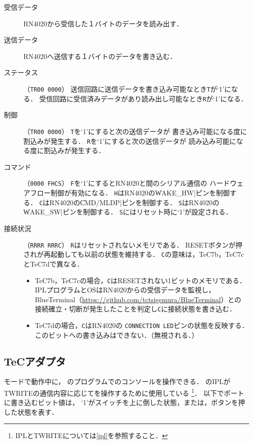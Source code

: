 \begin{description}
\item[受信データ]
  RN4020から受信した１バイトのデータを読み出す．
\item[送信データ]
  RN4020へ送信する１バイトのデータを書き込む．
\item[ステータス]（\texttt{TR00 0000}）
  送信回路に送信データを書き込み可能なとき\texttt{T}が`1'になる．
  受信回路に受信済みデータがあり読み出し可能なとき\texttt{R}が`1'になる．
\item[制御]（\texttt{TR00 0000}）
  \texttt{T}を`1'にすると次の送信データが
  書き込み可能になる度に割込みが発生する．
  \texttt{R}を`1'にすると次の送信データが
  読み込み可能になる度に割込みが発生する．
\item[コマンド]（\texttt{0000 FHCS}）
  \texttt{F}を`1'にするとRN4020と{\tac}間のシリアル通信の
  ハードウェアフロー制御が有効になる．
  \texttt{H}はRN4020の\|WAKE_HW|ピンを制御する．
  \texttt{C}はRN4020の\|CMD/MLDP|ピンを制御する．
  \texttt{S}はRN4020の\|WAKE_SW|ピンを制御する．
  \texttt{S}にはリセット時に`1'が設定される．
\item[接続状況]（\texttt{RRRR RRRC}）
  \texttt{R}はリセットされないメモリである．
  RESETボタンが押され{\tac}が再起動しても以前の状態を維持する．
  \texttt{C}の意味は，TeC7b，TeC7cとTeC7dで異なる．
  \begin{itemize}
  \item TeC7b，TeC7cの場合，\texttt{C}はRESETされない1ビットのメモリである．
    IPLプログラムとOSはRN4020からの受信データを監視し，
    BlueTerminal（\url{https://github.com/tctsigemura/BlueTerminal}）との
    接続確立・切断が発生したことを判定し\texttt{C}に接続状態を書き込む．
  \item TeC7dの場合，\texttt{C}はRN4020の
    \texttt{CONNECTION LED}ピンの状態を反映する．
    このビットへの書き込みはできない．（無視される．）
  \end{itemize}
\end{description}

\subsection{TeCアダプタ}
{\tec}モードで動作中に，
{\tac}のプログラムで{\tec}のコンソールを操作できる．
{\tac}のIPLがTWRITEの通信内容に応じて{\tec}を操作するために使用している
\footnote{IPLとTWRITEについては\ref{ipl}を参照すること．}．
以下でポートに書き込むビット値は，
`1'がスイッチを上に倒した状態，または，ボタンを押した状態を表す．

